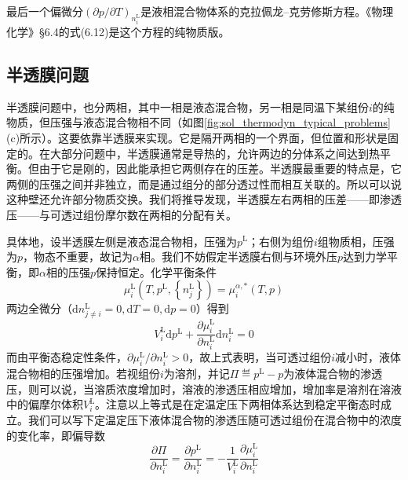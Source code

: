 \documentclass[main.tex]{subfiles}
\begin{document}
最后一个偏微分$\left(\partial p/\partial T\right)_{n_i^\text{L}}$是液相混合物体系的克拉佩龙--克劳修斯方程。《物理化学》\S6.4的式(6.12)是这个方程的纯物质版。

\subsection{半透膜问题}
半透膜问题中，也分两相，其中一相是液态混合物，另一相是同温下某组份$i$的纯物质，但压强与液态混合物相不同（如图\ref{fig:sol_thermodyn_typical_problems}(c)所示）。这要依靠半透膜来实现。它是隔开两相的一个界面，但位置和形状是固定的。在大部分问题中，半透膜通常是导热的，允许两边的分体系之间达到热平衡。但由于它是刚的，因此能承担它两侧存在的压差。半透膜最重要的特点是，它两侧的压强之间并非独立，而是通过组分的部分透过性而相互关联的。所以可以说这种壁还允许部分物质交换。我们将推导发现，半透膜左右两相的压差——即渗透压——与可透过组份摩尔数在两相的分配有关。

具体地，设半透膜左侧是液态混合物相，压强为$p^\text{L}$；右侧为组份$i$组物质相，压强为$p$，物态不重要，故记为$\alpha$相。我们不妨假定半透膜右侧与环境外压$p$达到力学平衡，即$\alpha$相的压强$p$保持恒定。化学平衡条件
\[\mu_i^\text{L}\left(T,p^\text{L},\left\{n_j^\text{L}\right\}\right)=\mu_i^{\alpha,*}\left(T,p\right)\]
两边全微分（$\mathrm{d}n_{j\neq i}^\text{L}=0,\mathrm{d}T=0,\mathrm{d}p=0$）得到
\[V_i^\text{L}\mathrm{d}p^\text{L}+\frac{\partial \mu_i^\text{L}}{\partial n_i^\text{L}}\mathrm{d}n_i^\text{L}=0\]
而由平衡态稳定性条件，$\partial\mu_i^\text{L}/\partial n_i^\text{L}>0$，故上式表明，当可透过组份$i$减小时，液体混合物相的压强增加。若视组份$i$为溶剂，并记$\Pi\eqdef p^\text{L}-p$为液体混合物的渗透压，则可以说，当溶质浓度增加时，溶液的渗透压相应增加，增加率是溶剂在溶液中的偏摩尔体积$V_i^\text{L}$。注意以上等式是在定温定压下两相体系达到稳定平衡态时成立。我们可以写下定温定压下液体混合物的渗透压随可透过组份在混合物中的浓度的变化率，即偏导数
\begin{equation}\label{eq:II.5_osmotic_pressure_partial_derivative}
    \frac{\partial\Pi}{\partial n_i^\text{L}}=\frac{\partial p^\text{L}}{\partial n_i^\text{L}}=-\frac{1}{V_i^\text{L}}\frac{\partial\mu_i^\text{L}}{\partial n_i^\text{L}}
\end{equation}
\end{document}
